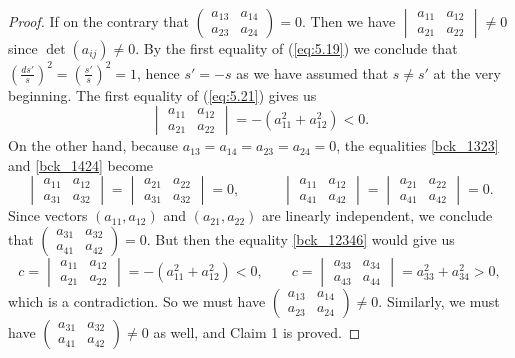\documentclass[10pt,a4paper]{amsart}
\begin{document}
\begin{proof}
If on the contrary that $\begin{pmatrix}a_{13} & a_{14} \\ a_{23} & a_{24} \end{pmatrix}=0$. Then we have $
\begin{vmatrix}a_{11} & a_{12} \\ a_{21} & a_{22} \end{vmatrix} \neq 0$ since $\det(a_{ij}) \neq 0$.
By the first equality of (\ref{eq:5.19}) we conclude that $(\frac{ds'}{s})^2=(\frac{s'}{s})^2=1$, hence $s'=-s$ as we have assumed that  $s \neq s'$ at the very beginning. The first equality of (\ref{eq:5.21}) gives us
$$
\begin{vmatrix}a_{11} & a_{12} \\ a_{21} & a_{22} \end{vmatrix}=  -(a_{11}^2+a_{12}^2) <0.
$$
On the other hand, because $a_{13}=a_{14}=a_{23}=a_{24}=0$,  the equalities \eqref{bck_1323} and \eqref{bck_1424} become
\[\begin{vmatrix}a_{11} & a_{12} \\ a_{31} & a_{32} \end{vmatrix}=\begin{vmatrix}a_{21} & a_{22} \\ a_{31} & a_{32} \end{vmatrix}=0,\quad \quad \quad
\begin{vmatrix}a_{11} & a_{12} \\ a_{41} & a_{42} \end{vmatrix}=\begin{vmatrix}a_{21} & a_{22} \\ a_{41} & a_{42} \end{vmatrix}=0.\]
Since vectors $(a_{11},a_{12})$ and $(a_{21},a_{22})$ are linearly independent, we conclude that
$\begin{pmatrix}a_{31} & a_{32} \\ a_{41} & a_{42} \end{pmatrix} =0$. But then
the equality \eqref{bck_12346} would give us
\[c=\begin{vmatrix}a_{11} & a_{12} \\ a_{21} & a_{22} \end{vmatrix}=-(a_{11}^2+a_{12}^2)<0,\quad \quad
c=\begin{vmatrix} a_{33} & a_{34} \\ a_{43} & a_{44} \end{vmatrix}=a_{33}^2+a_{34}^2>0,\]
which is a contradiction. So we must have $\begin{pmatrix}a_{13} & a_{14} \\ a_{23} & a_{24} \end{pmatrix} \neq 0$. Similarly, we must have
 $\begin{pmatrix}a_{31} & a_{32} \\ a_{41} & a_{42} \end{pmatrix} \neq 0$ as well, and Claim 1 is proved.
\vspace{0.2cm}


\end{proof}
\end{document}
